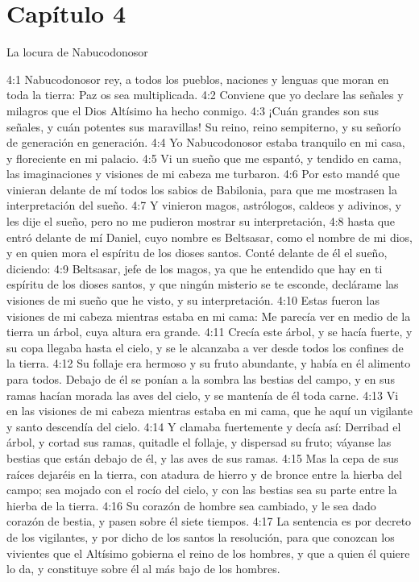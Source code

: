 \section*{Capítulo 4}
La locura de Nabucodonosor 
 
4:1 Nabucodonosor rey, a todos los pueblos, naciones y lenguas que moran en toda la tierra: Paz os sea multiplicada. 
4:2 Conviene que yo declare las señales y milagros que el Dios Altísimo ha hecho conmigo. 
4:3 ¡Cuán grandes son sus señales, y cuán potentes sus maravillas! Su reino, reino sempiterno, y su señorío de generación en generación. 
4:4 Yo Nabucodonosor estaba tranquilo en mi casa, y floreciente en mi palacio. 
4:5 Vi un sueño que me espantó, y tendido en cama, las imaginaciones y visiones de mi cabeza me turbaron. 
4:6 Por esto mandé que vinieran delante de mí todos los sabios de Babilonia, para que me mostrasen la interpretación del sueño. 
4:7 Y vinieron magos, astrólogos, caldeos y adivinos, y les dije el sueño, pero no me pudieron mostrar su interpretación, 
4:8 hasta que entró delante de mí Daniel, cuyo nombre es Beltsasar, como el nombre de mi dios, y en quien mora el espíritu de los dioses santos. Conté delante de él el sueño, diciendo: 
4:9 Beltsasar, jefe de los magos, ya que he entendido que hay en ti espíritu de los dioses santos, y que ningún misterio se te esconde, declárame las visiones de mi sueño que he visto, y su interpretación. 
4:10 Estas fueron las visiones de mi cabeza mientras estaba en mi cama: Me parecía ver en medio de la tierra un árbol, cuya altura era grande. 
4:11 Crecía este árbol, y se hacía fuerte, y su copa llegaba hasta el cielo, y se le alcanzaba a ver desde todos los confines de la tierra. 
4:12 Su follaje era hermoso y su fruto abundante, y había en él alimento para todos. Debajo de él se ponían a la sombra las bestias del campo, y en sus ramas hacían morada las aves del cielo, y se mantenía de él toda carne. 
4:13 Vi en las visiones de mi cabeza mientras estaba en mi cama, que he aquí un vigilante y santo descendía del cielo. 
4:14 Y clamaba fuertemente y decía así: Derribad el árbol, y cortad sus ramas, quitadle el follaje, y dispersad su fruto; váyanse las bestias que están debajo de él, y las aves de sus ramas. 
4:15 Mas la cepa de sus raíces dejaréis en la tierra, con atadura de hierro y de bronce entre la hierba del campo; sea mojado con el rocío del cielo, y con las bestias sea su parte entre la hierba de la tierra. 
4:16 Su corazón de hombre sea cambiado, y le sea dado corazón de bestia, y pasen sobre él siete tiempos. 
4:17 La sentencia es por decreto de los vigilantes, y por dicho de los santos la resolución, para que conozcan los vivientes que el Altísimo gobierna el reino de los hombres, y que a quien él quiere lo da, y constituye sobre él al más bajo de los hombres. 
